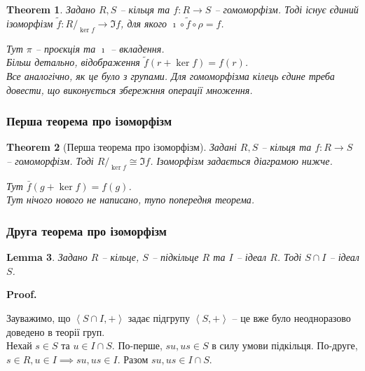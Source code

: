\documentclass[a4paper, 10pt]{article}
\makeatletter
\theoremstyle{theoremdd}
\newtheorem{theorem}{Theorem}[subsection]
\theoremstyle{theoremdd}
\theoremstyle{theoremdd}
\theoremstyle{theoremdd}
\theoremstyle{theoremdd}
\theoremstyle{theoremdd}
\theoremstyle{theoremdd}
\theoremstyle{theoremdd}
\theoremstyle{theoremdd}
\theoremstyle{theoremdd}
\theoremstyle{theoremdd}
\theoremstyle{theoremdd}
\theoremstyle{theoremdd}
\newtheorem{lemma}[theorem]{Lemma}
\theoremstyle{theoremdd}
\theoremstyle{theoremdd}
\renewenvironment{proof}[1][Proof.\\]{\par
\pushQED{\hfill \qed}%
\normalfont \topsep6\p@\@plus6\p@\relax
\trivlist
\item\relax
{\bfseries
#1\@addpunct{.}}\hspace\labelsep\ignorespaces
}{%
\popQED\endtrivlist\@endpefalse
}
\makeatother
\begin{document}
\begin{theorem}
Задано $R,S$ -- кільця та $f \colon R \to S$ -- гомоморфізм. Тоді існує єдиний ізоморфізм $\tilde{f} \colon R/_{\ker f} \to \Im f$, для якого $\imath \circ \tilde{f} \circ \rho = f$.
\begin{figure}[H]
\centering
{}
\end{figure}
Тут $\pi$ -- проєкція та $\imath$ -- вкладення.\\
Більш детально, відображення $\tilde{f}(r+ \ker f) = f(r)$.\\
\textit{Все аналогічно, як це було з групами. Для гомоморфізма кілець єдине треба довести, що виконується збережння операції множення.}
\end{theorem}

\subsubsection{Перша теорема про ізоморфізм}
\begin{theorem}[Перша теорема про ізоморфізм]
Задані $R,S$ -- кільця та $f \colon R \to S$ -- гомоморфізм. Тоді ${R}/_{\ker f} \cong \Im f$. Ізоморфізм задається діаграмою нижче.
\begin{figure}[H]
\centering
{}
\end{figure}
Тут $\bar{f}(g + \ker f) = f(g)$.\\
\textit{Тут нічого нового не написано, тупо попередня теорема.}
\end{theorem}

\subsubsection{Друга теорема про ізоморфізм}
\begin{lemma}
Задано $R$ -- кільце, $S$ -- підкільце $R$ та $I$ -- ідеал $R$. Тоді $S \cap I$ -- ідеал $S$.
\end{lemma}

\begin{proof}
Зауважимо, що $\left< S \cap I, + \right>$ задає підгрупу $\left< S, + \right>$ -- це вже було неодноразово доведено в теорії груп.\\
Нехай $s \in S$ та $u \in I \cap S$. По-перше, $su, us \in S$ в силу умови підкільця. По-друге, $s \in R, u \in I \implies su, us \in I$. Разом $su, us \in I \cap S$.
\end{proof}
\end{document}
